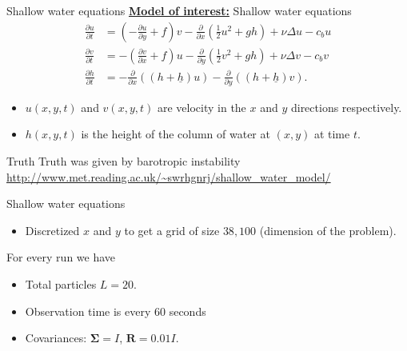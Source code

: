 \documentclass[aspectratio=169]{beamer}
\newcommand{\modelcovariance}{\boldsymbol{\Sigma}}
\newcommand{\observationcovariance}{\boldsymbol{R}}
\begin{document}

\begin{frame}{Shallow water equations}
\vfill
    \textbf{\underline{Model of interest:}} Shallow water equations
    \begin{align*}
        \frac{\partial u}{\partial t} &= \left(-\frac{\partial u}{\partial y} + f\right) v - \frac{\partial}{\partial x} \left(\frac{1}{2} u^2 +gh\right) + \nu \Delta u - c_b u\\
        \frac{\partial v}{\partial t} &= -\left(\frac{\partial v}{\partial x}+f\right) u - \frac{\partial}{\partial y} \left(\frac{1}{2} v^2 +gh\right) + \nu \Delta v - c_b v\\
        \frac{\partial h}{\partial t} &= -\frac{\partial}{\partial x} ((h+\underline{h})u)-\frac{\partial}{\partial y} ((h+\underline{h})v).
    \end{align*}

    \begin{itemize}
        \item $u(x,y,t)$ and $v(x,y,t)$ are velocity in the $x$ and $y$ directions respectively.
        \item $h(x,y,t)$ is the height of the column of water at $(x,y)$ at time $t$.
    \end{itemize}
\vfill
\end{frame}


\begin{frame}{Truth}
\vfill
    Truth was given by barotropic instability \url{http://www.met.reading.ac.uk/~swrhgnrj/shallow_water_model/}
\vfill
\end{frame}


\begin{frame}{Shallow water equations}
\vfill
    \begin{itemize}
        \item Discretized $x$ and $y$ to get a grid of size $38,100$ (dimension of the problem).
    \end{itemize}

For every run we have
    \begin{itemize}
        \item Total particles $L=20$.
        \item Observation time is every 60 seconds
        \item Covariances: $\modelcovariance = I$, $\observationcovariance = 0.01I$.
    \end{itemize}
\vfill
\end{frame}
\end{document}
